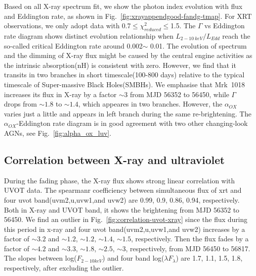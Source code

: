 \documentclass{aastex63}
\begin{document}
Based on all X-ray spectrum fit, we show the photon index evolution with flux and Eddington rate, as shown in Fig.~\ref{fig:xrayappendgood-fandg-tmap}. For XRT observations, we only adopt data with 0.7$\le \chi^2_{reduced} \le$1.5. The $\Gamma$ vs Eddington rate diagram shows distinct evolution relationship when $L_{2-10~ keV}/L_{Edd}$ reach the so-called critical Eddington rate around 0.002$\sim$ 0.01. The evolution of spectrum and the dimming of X-ray flux might be caused by the central engine activities as the intrinsic absorption(nH) is consistent with zero. However, we find that it transits in two branches in short timescale(100-800 days) relative to the typical timescale of Super-massive Black Holes(SMBHs). We emphasise that Mrk~1018 increases its flux in X-ray by a factor $\sim3$ from MJD 56352 to 56450, while $\Gamma$ drops from $\sim1.8$ to $\sim1.4$, which appeares in two branches. However, the $\alpha_{OX}$ varies just a little and appears in left branch during the same re-brightening. The $\alpha_{OX}$-Eddington rate diagram is in good agreement with two other changing-look AGNs, see Fig.~\ref{fig:alpha_ox_luv}. 




\subsection{Correlation between X-ray and ultraviolet}
During the fading phase, the X-ray flux shows strong linear correlation with UVOT data. The spearmanr coefficiency between simultaneous flux of xrt and four uvot band(uvm2,u,uvw1,and uvw2) are 0.99, 0.9, 0.86, 0.94, respectively. Both in X-ray and UVOT band, it shows the brightening from MJD 56352 to 56450. We find an outlier in Fig.~\ref{fig:correlation-uvot-xray} since the flux during this period in x-ray and four uvot  band(uvm2,u,uvw1,and uvw2) increases by a factor of $\sim 3.2$ and $\sim 1.2$, $\sim 1.2$, $\sim 1.4$, $\sim 1.5$, respectively. Then the flux fades by a factor of $\sim 4.2$ and $\sim 3.3$, $\sim 1.8$, $\sim 2.5$, $\sim 3$, respectively, from MJD 56450 to 56817. The slopes between log($F_{2-10keV}$) and four band log($\lambda F_{\lambda}$) are 1.7, 1.1, 1.5, 1.8, respectively, after excluding the outlier.
\end{document}

